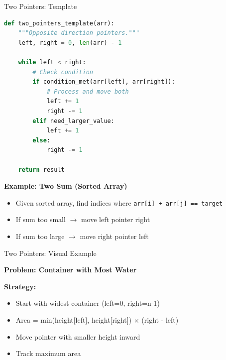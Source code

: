 \documentclass[aspectratio=169,xcolor=dvipsnames]{beamer}
\begin{document}
\begin{frame}[fragile]{Two Pointers: Template}
\begin{lstlisting}[language=Python, basicstyle=\small\ttfamily]
def two_pointers_template(arr):
    """Opposite direction pointers."""
    left, right = 0, len(arr) - 1

    while left < right:
        # Check condition
        if condition_met(arr[left], arr[right]):
            # Process and move both
            left += 1
            right -= 1
        elif need_larger_value:
            left += 1
        else:
            right -= 1

    return result
\end{lstlisting}

\textbf{Example: Two Sum (Sorted Array)}
\begin{itemize}
  \item Given sorted array, find indices where \texttt{arr[i] + arr[j] == target}
  \item If sum too small $\to$ move left pointer right
  \item If sum too large $\to$ move right pointer left
\end{itemize}
\end{frame}

\begin{frame}{Two Pointers: Visual Example}
  \begin{center}
    \textbf{Problem: Container with Most Water}

    \vspace{0.3cm}
  \end{center}

  \vspace{0.2cm}
  \textbf{Strategy:}
  \begin{itemize}
    \item Start with widest container (left=0, right=n-1)
    \item Area = min(height[left], height[right]) $\times$ (right - left)
    \item Move pointer with smaller height inward
    \item Track maximum area
  \end{itemize}
\end{frame}
\end{document}

